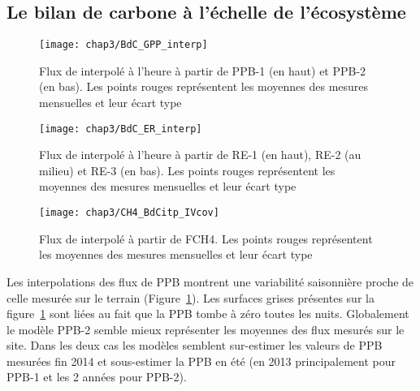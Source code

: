 \subsection{Le bilan de carbone à l'échelle de l'écosystème}


\begin{figure}[!hbt]
\centering
\texttt{[image: chap3/BdC\_GPP\_interp]}
\caption{Flux de \coo interpolé à l'heure à partir de PPB-1 (en haut) et PPB-2 (en bas). Les points rouges représentent les moyennes des mesures mensuelles et leur écart type}
\label{fig:BdC_GPP_interp}
\end{figure}

\begin{figure}
\centering
\texttt{[image: chap3/BdC\_ER\_interp]}
\caption{Flux de \coo interpolé à l'heure à partir de RE-1 (en haut), RE-2 (au milieu) et RE-3 (en bas). Les points rouges représentent les moyennes des mesures mensuelles et leur écart type}
\label{fig:BdC_ER_interp}
\end{figure}

\begin{figure}
\centering
\texttt{[image: chap3/CH4\_BdCitp\_IVcov]}
\caption{Flux de \chh interpolé à partir de FCH4. Les points rouges représentent les moyennes des mesures mensuelles et leur écart type}
\label{fig:BdC_CH4_interp}
\end{figure}



Les interpolations des flux de PPB montrent une variabilité saisonnière proche de celle mesurée sur le terrain (Figure~\ref{fig:BdC_GPP_interp}). 
Les surfaces grises présentes sur la figure~\ref{fig:BdC_GPP_interp} sont liées au fait que la PPB tombe à zéro toutes les nuits.
Globalement le modèle PPB-2 semble mieux représenter les moyennes des flux mesurés sur le site.
Dans les deux cas les modèles semblent sur-estimer les valeurs de PPB mesurées fin 2014 et sous-estimer la PPB en été (en 2013 principalement pour PPB-1 et les 2 années pour PPB-2).

